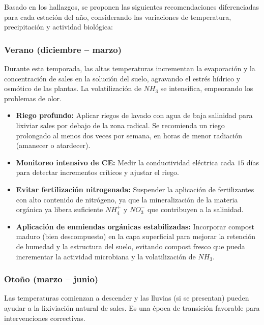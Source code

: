 \documentclass[fleqn]{jaes}
\begin{document}
Basado en los hallazgos, se proponen las siguientes recomendaciones diferenciadas para cada estación del año, considerando las variaciones de temperatura, precipitación y actividad biológica:

\subsubsection{Verano (diciembre -- marzo)}

Durante esta temporada, las altas temperaturas incrementan la evaporación y la concentración de sales en la solución del suelo, agravando el estrés hídrico y osmótico de las plantas. La volatilización de $NH_3$ se intensifica, empeorando los problemas de olor.

\begin{itemize}
  \item \textbf{Riego profundo:} Aplicar riegos de lavado con agua de baja salinidad para lixiviar sales por debajo de la zona radical. Se recomienda un riego prolongado al menos dos veces por semana, en horas de menor radiación (amanecer o atardecer).
  \item \textbf{Monitoreo intensivo de CE:} Medir la conductividad eléctrica cada $15$ días para detectar incrementos críticos y ajustar el riego.
  \item \textbf{Evitar fertilización nitrogenada:} Suspender la aplicación de fertilizantes con alto contenido de nitrógeno, ya que la mineralización de la materia orgánica ya libera suficiente $NH_4^+$ y $NO_3^-$ que contribuyen a la salinidad.
  \item \textbf{Aplicación de enmiendas orgánicas estabilizadas:} Incorporar compost maduro (bien descompuesto) en la capa superficial para mejorar la retención de humedad y la estructura del suelo, evitando compost fresco que pueda incrementar la actividad microbiana y la volatilización de $NH_3$.
\end{itemize}

\subsubsection{Otoño (marzo -- junio)}

Las temperaturas comienzan a descender y las lluvias (si se presentan) pueden ayudar a la lixiviación natural de sales. Es una época de transición favorable para intervenciones correctivas.
\end{document}
